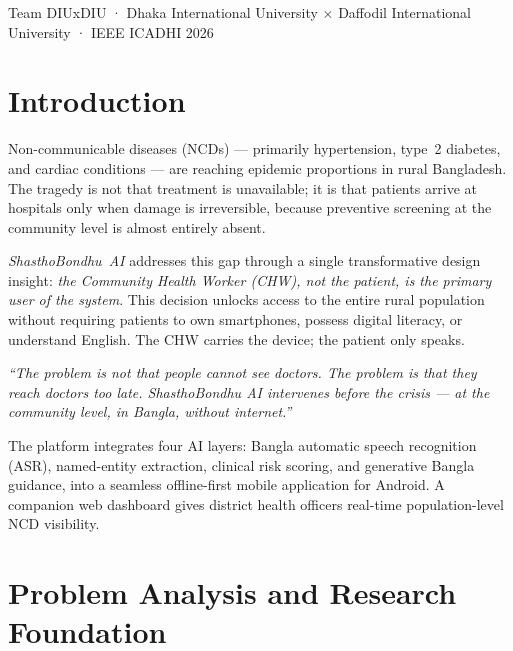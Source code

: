 \documentclass[12pt, a4paper]{article}
\newcommand{\sba}{\textit{ShasthoBondhu~AI}}
\begin{document}
\begin{titlepage}
\vfill

\begin{center}
\small\textcolor{gray60}{%
  Team DIUxDIU \quad·\quad
  Dhaka International University × Daffodil International University \quad·\quad
  IEEE ICADHI 2026%
}
\end{center}
\end{titlepage}

\tableofcontents
\clearpage

\section{Introduction}

Non-communicable diseases (NCDs) — primarily hypertension, type~2 diabetes, and
cardiac conditions — are reaching epidemic proportions in rural Bangladesh.
The tragedy is not that treatment is unavailable; it is that patients arrive at
hospitals only when damage is irreversible, because preventive screening at the
community level is almost entirely absent.

\sba{} addresses this gap through a single transformative design insight:
\textit{the Community Health Worker (CHW), not the patient, is the primary user
of the system}. This decision unlocks access to the entire rural population
without requiring patients to own smartphones, possess digital literacy, or
understand English. The CHW carries the device; the patient only speaks.

\begin{researchbox}
\small
\textit{``The problem is not that people cannot see doctors. The problem is that
they reach doctors too late. ShasthoBondhu AI intervenes before the crisis ---
at the community level, in Bangla, without internet.''}
\end{researchbox}

The platform integrates four AI layers: Bangla automatic speech recognition (ASR),
named-entity extraction, clinical risk scoring, and generative Bangla guidance,
into a seamless offline-first mobile application for Android. A companion web
dashboard gives district health officers real-time population-level NCD visibility.

\section{Problem Analysis and Research Foundation}
\end{document}

